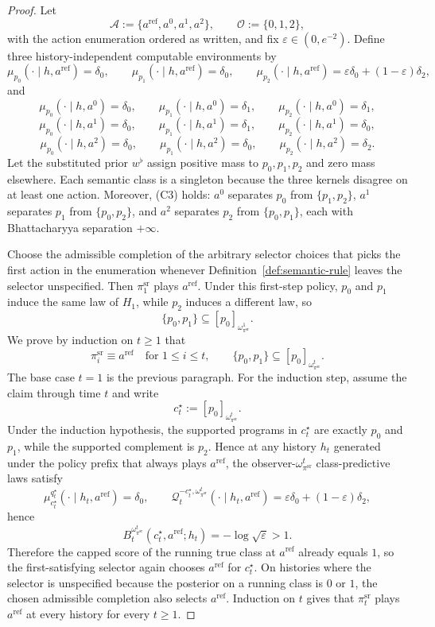 \documentclass[11pt]{article}
\theoremstyle{definition}
\theoremstyle{remark}
\newcommand{\Acal}{\mathcal{A}}
\newcommand{\Ocal}{\mathcal{O}}
\newcommand{\Qcal}{\mathcal{Q}}
\begin{document}
\begin{proof}
Let
\[
\Acal:=\{a^{\mathrm{ref}},a^0,a^1,a^2\},
\qquad
\Ocal:=\{0,1,2\},
\]
with the action enumeration ordered as written, and fix $\varepsilon\in(0,e^{-2})$. Define three history-independent computable environments by
\[
\mu_{p_0}(\cdot\mid h,a^{\mathrm{ref}})=\delta_0,
\qquad
\mu_{p_1}(\cdot\mid h,a^{\mathrm{ref}})=\delta_0,
\qquad
\mu_{p_2}(\cdot\mid h,a^{\mathrm{ref}})=\varepsilon\delta_0+(1-\varepsilon)\delta_2,
\]
and
\[
\mu_{p_0}(\cdot\mid h,a^0)=\delta_0,
\qquad
\mu_{p_1}(\cdot\mid h,a^0)=\delta_1,
\qquad
\mu_{p_2}(\cdot\mid h,a^0)=\delta_1,
\]
\[
\mu_{p_0}(\cdot\mid h,a^1)=\delta_0,
\qquad
\mu_{p_1}(\cdot\mid h,a^1)=\delta_1,
\qquad
\mu_{p_2}(\cdot\mid h,a^1)=\delta_0,
\]
\[
\mu_{p_0}(\cdot\mid h,a^2)=\delta_0,
\qquad
\mu_{p_1}(\cdot\mid h,a^2)=\delta_0,
\qquad
\mu_{p_2}(\cdot\mid h,a^2)=\delta_2.
\]
Let the substituted prior $w^\flat$ assign positive mass to $p_0,p_1,p_2$ and zero mass elsewhere.
Each semantic class is a singleton because the three kernels disagree on at least one action. Moreover, (C3) holds: $a^0$ separates $p_0$ from $\{p_1,p_2\}$, $a^1$ separates $p_1$ from $\{p_0,p_2\}$, and $a^2$ separates $p_2$ from $\{p_0,p_1\}$, each with Bhattacharyya separation $+\infty$.

Choose the admissible completion of the arbitrary selector choices that picks the first action in the enumeration whenever Definition~\ref{def:semantic-rule} leaves the selector unspecified. Then $\pi_1^{\mathrm{sr}}$ plays $a^{\mathrm{ref}}$. Under this first-step policy, $p_0$ and $p_1$ induce the same law of $H_1$, while $p_2$ induces a different law, so
\[
\{p_0,p_1\}\subseteq [p_0]_{\omega_{\pi^{\mathrm{sr}}}^1}.
\]
We prove by induction on $t\ge 1$ that
\[
\pi_i^{\mathrm{sr}}\equiv a^{\mathrm{ref}}
\quad\text{for }1\le i\le t,
\qquad
\{p_0,p_1\}\subseteq [p_0]_{\omega_{\pi^{\mathrm{sr}}}^t}.
\]
The base case $t=1$ is the previous paragraph. For the induction step, assume the claim through time $t$ and write
\[
c_t^\star:=[p_0]_{\omega_{\pi^{\mathrm{sr}}}^t}.
\]
Under the induction hypothesis, the supported programs in $c_t^\star$ are exactly $p_0$ and $p_1$, while the supported complement is $p_2$. Hence at any history $h_t$ generated under the policy prefix that always plays $a^{\mathrm{ref}}$, the observer-$\omega_{\pi^{\mathrm{sr}}}^t$ class-predictive laws satisfy
\[
\mu_{c_t^\star}^{q_t^\star}(\cdot\mid h_t,a^{\mathrm{ref}})=\delta_0,
\qquad
\Qcal_t^{-c_t^\star,\omega_{\pi^{\mathrm{sr}}}^t}(\cdot\mid h_t,a^{\mathrm{ref}})=\varepsilon\delta_0+(1-\varepsilon)\delta_2,
\]
hence
\[
B_t^{\omega_{\pi^{\mathrm{sr}}}^t}(c_t^\star,a^{\mathrm{ref}};h_t)
=
-\log\sqrt{\varepsilon}>1.
\]
Therefore the capped score of the running true class at $a^{\mathrm{ref}}$ already equals $1$, so the first-satisfying selector again chooses $a^{\mathrm{ref}}$ for $c_t^\star$. On histories where the selector is unspecified because the posterior on a running class is $0$ or $1$, the chosen admissible completion also selects $a^{\mathrm{ref}}$. Induction on $t$ gives that $\pi_t^{\mathrm{sr}}$ plays $a^{\mathrm{ref}}$ at every history for every $t\ge 1$.


\end{proof}
\end{document}
